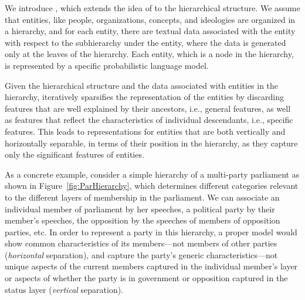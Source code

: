 We introduce \hswlms, which extends the idea of \swlms to the hierarchical structure. We assume that entities, like people, organizations, concepts, and ideologies are organized in a hierarchy, and for each entity, there are textual data associated with the entity with respect to the subhierarchy under the entity, where the data is generated only at the leaves of the hierarchy. Each entity, which is a node in the hierarchy, is represented by a specific probabilistic language model.

Given the hierarchical structure and the data associated with entities in the hierarchy, \achswlm iteratively sparsifies the representation of the entities by discarding features that are well explained by their ancestors, i.e., general features, as well as features that reflect the characteristics of individual descendants, i.e., specific features. This leads to representations for entities that are both vertically and horizontally separable, in terms of their position in the hierarchy, as they capture only the significant features of entities.


As a concrete example, consider a simple hierarchy of a multi\:-\:party parliament as shown in Figure~\ref{fig:ParHierarchy}, which determines different categories relevant to the different layers of membership in the parliament.  We can associate an individual member of parliament by her speeches, a political party by their member's speeches, the opposition by the speeches of members of opposition parties, etc. 
In order to represent a party in this hierarchy, a proper model would show common characteristics of its members\:---\:not members of other parties (\emph{horizontal} separation), and capture the party's generic characteristics\:---\:not unique aspects of the current members captured in the individual member's layer or aspects of whether the party is in government or opposition captured in the status layer (\emph{vertical} separation).

